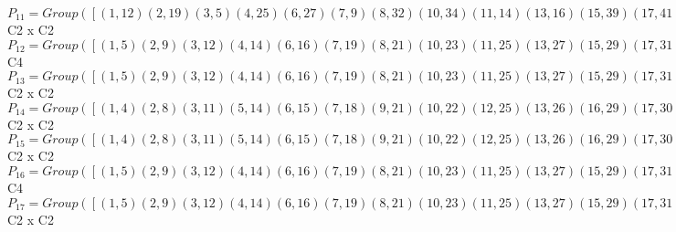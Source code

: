 \documentclass[varwidth=\maxdimen,border=10]{standalone}
\begin{document}
\begin{tabular}
$P_{11} = Group( [ ( 1,12)( 2,19)( 3, 5)( 4,25)( 6,27)( 7, 9)( 8,32)(10,34)(11,14)(13,16)(15,39)(17,41)(18,21)(20,23)(22,43)(24,45)(26,29)(28,31)(30,47)(33,36)(35,38)(37,48)(40,42)(44,46), ( 1, 2)( 3, 7)( 4,21)( 5, 9)( 6,24)( 8,14)(10,17)(11,32)(12,19)(13,35)(15,46)(16,38)(18,25)(20,28)(22,42)(23,31)(26,48)(27,45)(29,37)(30,36)(33,47)(34,41)(39,44)(40,43) ] )\cong$ C2 x C2\ \\
$P_{12} = Group( [ ( 1, 5)( 2, 9)( 3,12)( 4,14)( 6,16)( 7,19)( 8,21)(10,23)(11,25)(13,27)(15,29)(17,31)(18,32)(20,34)(22,36)(24,38)(26,39)(28,41)(30,42)(33,43)(35,45)(37,46)(40,47)(44,48), ( 1,21, 5, 8)( 2,14, 9, 4)( 3,32,12,18)( 6,46,16,37)( 7,25,19,11)(10,42,23,30)(13,48,27,44)(15,24,29,38)(17,36,31,22)(20,47,34,40)(26,35,39,45)(28,43,41,33) ] )\cong$ C4\ \\
$P_{13} = Group( [ ( 1, 5)( 2, 9)( 3,12)( 4,14)( 6,16)( 7,19)( 8,21)(10,23)(11,25)(13,27)(15,29)(17,31)(18,32)(20,34)(22,36)(24,38)(26,39)(28,41)(30,42)(33,43)(35,45)(37,46)(40,47)(44,48), ( 1, 2)( 3, 7)( 4,21)( 5, 9)( 6,24)( 8,14)(10,17)(11,32)(12,19)(13,35)(15,46)(16,38)(18,25)(20,28)(22,42)(23,31)(26,48)(27,45)(29,37)(30,36)(33,47)(34,41)(39,44)(40,43) ] )\cong$ C2 x C2\ \\
$P_{14} = Group( [ ( 1, 4)( 2, 8)( 3,11)( 5,14)( 6,15)( 7,18)( 9,21)(10,22)(12,25)(13,26)(16,29)(17,30)(19,32)(20,33)(23,36)(24,37)(27,39)(28,40)(31,42)(34,43)(35,44)(38,46)(41,47)(45,48), ( 1, 3)( 2, 7)( 4,11)( 5,12)( 6,13)( 8,18)( 9,19)(10,20)(14,25)(15,26)(16,27)(17,28)(21,32)(22,33)(23,34)(24,35)(29,39)(30,40)(31,41)(36,43)(37,44)(38,45)(42,47)(46,48) ] )\cong$ C2 x C2\ \\
$P_{15} = Group( [ ( 1, 4)( 2, 8)( 3,11)( 5,14)( 6,15)( 7,18)( 9,21)(10,22)(12,25)(13,26)(16,29)(17,30)(19,32)(20,33)(23,36)(24,37)(27,39)(28,40)(31,42)(34,43)(35,44)(38,46)(41,47)(45,48), ( 1,12)( 2,19)( 3, 5)( 4,25)( 6,27)( 7, 9)( 8,32)(10,34)(11,14)(13,16)(15,39)(17,41)(18,21)(20,23)(22,43)(24,45)(26,29)(28,31)(30,47)(33,36)(35,38)(37,48)(40,42)(44,46) ] )\cong$ C2 x C2\ \\
$P_{16} = Group( [ ( 1, 5)( 2, 9)( 3,12)( 4,14)( 6,16)( 7,19)( 8,21)(10,23)(11,25)(13,27)(15,29)(17,31)(18,32)(20,34)(22,36)(24,38)(26,39)(28,41)(30,42)(33,43)(35,45)(37,46)(40,47)(44,48), ( 1,32, 5,18)( 2,25, 9,11)( 3,21,12, 8)( 4, 7,14,19)( 6,48,16,44)(10,47,23,40)(13,46,27,37)(15,35,29,45)(17,43,31,33)(20,42,34,30)(22,28,36,41)(24,39,38,26) ] )\cong$ C4\ \\
$P_{17} = Group( [ ( 1, 5)( 2, 9)( 3,12)( 4,14)( 6,16)( 7,19)( 8,21)(10,23)(11,25)(13,27)(15,29)(17,31)(18,32)(20,34)(22,36)(24,38)(26,39)(28,41)(30,42)(33,43)(35,45)(37,46)(40,47)(44,48), ( 1,11)( 2,18)( 3, 4)( 5,25)( 6,26)( 7, 8)( 9,32)(10,33)(12,14)(13,15)(16,39)(17,40)(19,21)(20,22)(23,43)(24,44)(27,29)(28,30)(31,47)(34,36)(35,37)(38,48)(41,42)(45,46) ] )\cong$ C2 x C2\ \\

\end{tabular}
\end{document}
